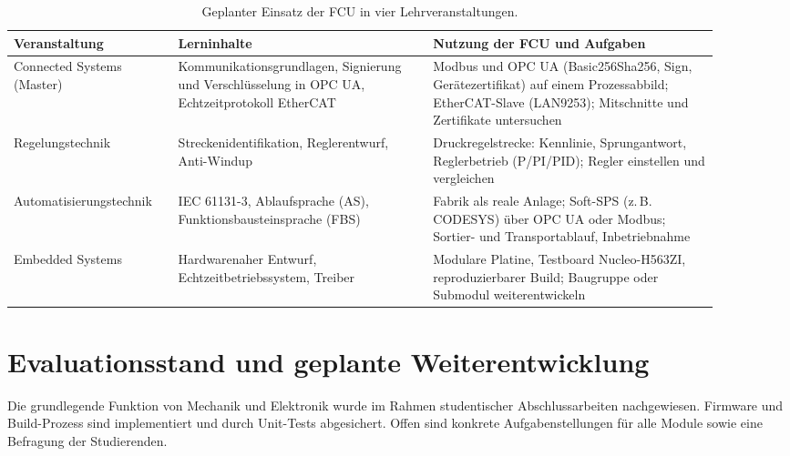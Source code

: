 \documentclass[]{article}%
\begin{document}
\begin{table}[htbp]
\centering
\small
\caption{Geplanter Einsatz der FCU in vier Lehrveranstaltungen.}
\label{tab:lehrveranstaltungen}
\begin{tabular}{p{0.20\linewidth}p{0.33\linewidth}p{0.37\linewidth}}
\toprule
\textbf{Veranstaltung} & \textbf{Lerninhalte} & \textbf{Nutzung der FCU und Aufgaben} \\
\midrule
Connected Systems (Master) & Kommunikationsgrundlagen, Signierung und Verschlüsselung in OPC UA, Echtzeitprotokoll EtherCAT & Modbus und OPC UA (Basic256Sha256, Sign, Gerätezertifikat) auf einem Prozessabbild; EtherCAT-Slave (LAN9253); Mitschnitte und Zertifikate untersuchen \\[2pt]
Regelungstechnik & Streckenidentifikation, Reglerentwurf, Anti-Windup & Druckregelstrecke: Kennlinie, Sprungantwort, Reglerbetrieb (P/PI/PID); Regler einstellen und vergleichen \\[2pt]
Automatisierungs\-technik & IEC 61131-3, Ablaufsprache (AS), Funktionsbausteinsprache (FBS) & Fabrik als reale Anlage; Soft-SPS (z.\,B. CODESYS) über OPC UA oder Modbus; Sortier- und Transportablauf, Inbetriebnahme \\[2pt]
Embedded Systems & Hardwarenaher Entwurf, Echtzeitbetriebssystem, Treiber & Modulare Platine, Testboard Nucleo-H563ZI, reproduzierbarer Build; Baugruppe oder Submodul weiterentwickeln \\
\bottomrule
\end{tabular}
\end{table}


\section{Evaluationsstand und geplante Weiterentwicklung}
\label{sec:evaluation}
Die grundlegende Funktion von Mechanik und Elektronik wurde im Rahmen studentischer Abschlussarbeiten nachgewiesen. Firmware und Build-Prozess sind implementiert und durch Unit-Tests abgesichert. Offen sind konkrete Aufgabenstellungen für alle Module sowie eine Befragung der Studierenden.
\end{document}
